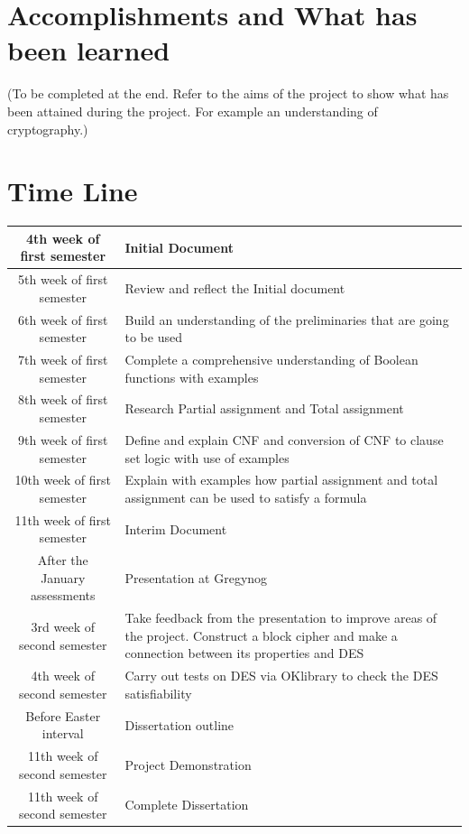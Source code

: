 \documentclass[11pt,a4paper, notitlepage]{report}
\begin{document}
\section{Accomplishments and What has been learned}
\label{sec:Accomplishemnts}

(To be completed at the end. Refer to the aims of the project to show what has been attained during the project. For example an understanding of cryptography.)

\section{Time Line}
\label{sec:TimeLine}

\begin{center}
\begin{tabular}{|c|p{5cm}|}
\hline
4th week of first semester & Initial Document \\\hline
5th week of first semester & Review and reflect the Initial document\\ \hline
6th week of first semester & Build an understanding of the preliminaries that are going to be used\\ \hline
7th week of first semester & Complete a comprehensive understanding of Boolean functions with examples\\ \hline
8th week of first semester & Research Partial assignment and Total assignment \\ \hline
9th week of first semester & Define and explain CNF and conversion of CNF to clause set logic with use of examples \\ \hline
10th week of first semester & Explain with examples how partial assignment and total assignment can be used to satisfy a formula\\\hline
11th week of first semester & Interim Document\\ \hline
After the January assessments & Presentation at Gregynog\\ \hline
3rd week of second semester & Take feedback from the presentation to improve areas of the project. Construct a block cipher and make a connection between its properties and DES\\ \hline
4th week of second semester & Carry out tests on DES via OKlibrary to check the DES satisfiability\\ \hline
Before Easter interval & Dissertation outline\\ \hline
11th week of second semester & Project Demonstration\\ \hline
11th week of second semester & Complete Dissertation\\ \hline
\hline
\end{tabular}
\end{center}
\end{document}

